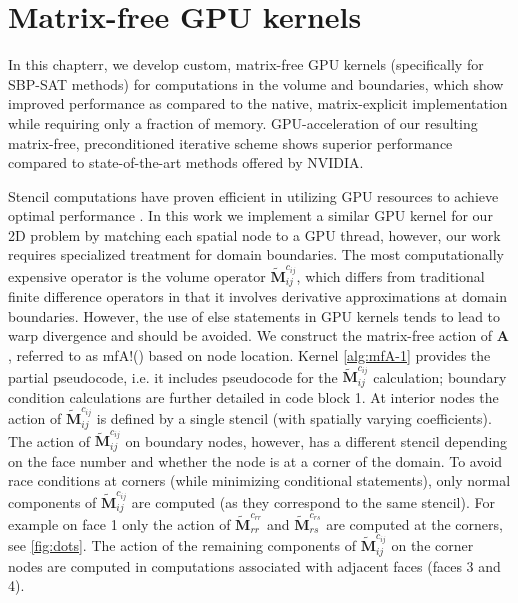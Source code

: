 \section{Matrix-free GPU kernels}
In this chapterr, we develop custom, matrix-free GPU kernels (specifically for SBP-SAT methods) for computations in the volume and boundaries, which show improved performance as compared to the native, matrix-explicit implementation while requiring only a fraction of memory. GPU-acceleration of our resulting matrix-free, preconditioned iterative scheme shows superior performance compared to state-of-the-art methods offered by NVIDIA.

Stencil computations have proven efficient in utilizing GPU resources to achieve optimal performance \cite{vizitiu2014optimized,krotkiewski2013efficient}. In this work we implement a similar GPU kernel for our 2D problem by matching each spatial node to a GPU thread, however, our work requires specialized treatment for domain boundaries. The most computationally expensive operator is the volume operator $\tilde{\boldsymbol{M}}^{c_{ij}}_{ij}$, which differs from traditional finite difference operators in that it involves derivative approximations at domain boundaries. However, the use of else statements in GPU kernels tends to lead to warp divergence and should be avoided. We construct the matrix-free action of $\boldsymbol{A}$, referred to as {\ttfamily mfA!}() based on node location. Kernel \autoref{alg:mfA-1} provides the partial pseudocode, i.e. it includes pseudocode for the $\tilde{\boldsymbol{M}}^{c_{ij}}_{ij}$ calculation; boundary condition calculations are further detailed in code block 1.  At interior nodes the action of $\tilde{\boldsymbol{M}}^{c_{ij}}_{ij}$ is defined by a single stencil (with spatially varying coefficients). The action of $\tilde{\boldsymbol{M}}^{c_{ij}}_{ij}$ on boundary nodes, however, has a different stencil depending on the face number and whether the node is at a corner of the domain. To avoid race conditions at corners (while minimizing conditional statements), only normal components of $\tilde{\boldsymbol{M}}^{c_{ij}}_{ij}$ are computed (as they correspond to the same stencil). For example on face 1 only the action of $\tilde{\boldsymbol{M}}^{c_{rr}}_{rr}$ and $\tilde{\boldsymbol{M}}^{c_{rs}}_{rs}$ are computed at the corners, see \autoref{fig:dots}. The action of the remaining components of $\tilde{\boldsymbol{M}}^{c_{ij}}_{ij}$ on the corner nodes are computed in computations associated with adjacent faces (faces 3 and 4). 

